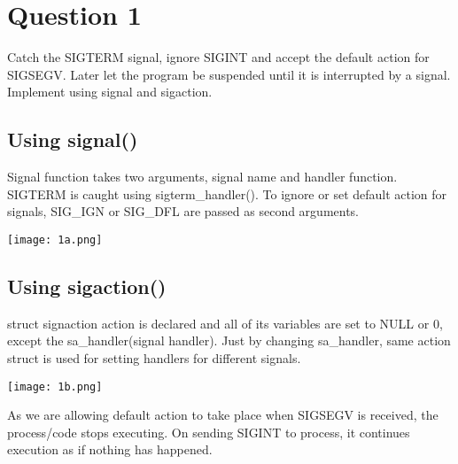 \documentclass[main.tex]{subfiles}
\begin{document}
\section{Question 1}

Catch the SIGTERM signal, ignore SIGINT and accept the default action for
SIGSEGV. Later let the program be suspended until it is interrupted by a signal.
Implement using signal and sigaction.

\subsection{Using signal()}


Signal function takes two arguments, signal name and handler function. SIGTERM
is caught using sigterm\_handler(). To ignore or set default action for signals,
SIG\_IGN or SIG\_DFL are passed as second arguments.

\texttt{[image: 1a.png]}


\subsection{Using sigaction()}


struct signaction action is declared and all of its variables are set to NULL or
0, except the sa\_handler(signal handler). Just by changing sa\_handler, same
action struct is used for setting handlers for different signals.

\texttt{[image: 1b.png]}

As we are allowing default action to take place when SIGSEGV is received, the
process/code stops executing. On sending SIGINT to process, it continues
execution as if nothing has happened.

\clearpage
\end{document}
